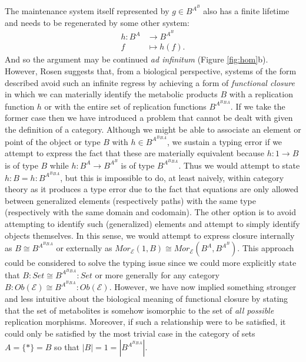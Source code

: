 The maintenance system itself represented by $g \in B^{A^B}$ also has a finite lifetime and needs to be regenerated by some other system:
\begin{align*}
h \colon B^A & \longrightarrow B^{A^B}\\
f & \longmapsto h(f).
\end{align*}	
And so the argument may be continued \emph{ad infinitum} (Figure \ref{fig:hom}b). However, Rosen suggests that, from a biological perspective, systems of the form described avoid such an infinite regress by achieving a form of \emph{functional closure} in which we can materially identify the metabolic products $B$ with a replication function $h$ or with the entire set of replication functions $B^{A^B{^B{^A}}}$. If we take the former case then we have introduced a problem that cannot be dealt with given the definition of a category. Although we might be able to associate an element or point of the object or type $B$ with $h \in B^{A^B{^B{^A}}}$, we sustain a typing error if we attempt to express the fact that these are materially equivalent because $h \colon 1 \rightarrow B$ is of type $B$ while $h \colon B^A \rightarrow B^{A^B}$ is of type $B^{A^B{^B{^A}}}$. Thus we would attempt to state $h:B = h:B^{A^B{^B{^A}}}$, but this is impossible to do, at least naively, within category theory as it produces a type error due to the fact that equations are only allowed between generalized elements (respectively paths) with the same type (respectively with the same domain and codomain). The other option is to avoid attempting to identify such (generalized) elements and attempt to simply identify objects themselves. In this sense, we would attempt to express closure internally as $B \cong B^{A^B{^B{^A}}}$ or externally as $Mor_{\mathcal{E}}(1,B) \cong Mor_{\mathcal{E}}(B^A,B^{A^B})$. This approach could be considered to solve the typing issue since we could more explicitly state that $B \colon Set \cong B^{A^B{^B{^A}}} \colon Set$ or more generally for any category $B \colon Ob(\mathcal{E}) \cong B^{A^B{^B{^A}}} \colon Ob(\mathcal{E})$. However, we have now implied something stronger and less intuitive about the biological meaning of functional closure by stating that the set of metabolites is somehow isomorphic to the set of \emph{all possible} replication morphisms. Moreover, if such a relationship were to be satisfied, it could only be satisfied by the most trivial case in the category of sets $A = \{*\} = B$ so that $|B|=1=|B^{A^B{^B{^A}}}|$.

